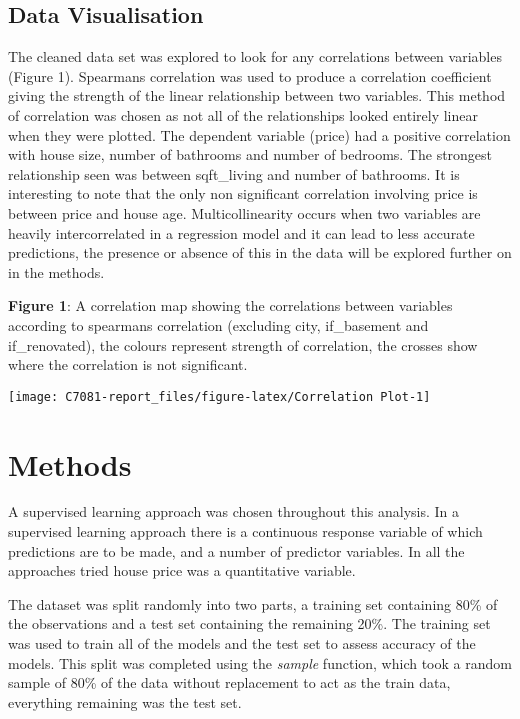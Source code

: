 \documentclass[
]{article}
\begin{document}
\hypertarget{data-visualisation}{%
\subsection{Data Visualisation}\label{data-visualisation}}

The cleaned data set was explored to look for any correlations between
variables (Figure 1). Spearmans correlation was used to produce a
correlation coefficient giving the strength of the linear relationship
between two variables. This method of correlation was chosen as not all
of the relationships looked entirely linear when they were plotted. The
dependent variable (price) had a positive correlation with house size,
number of bathrooms and number of bedrooms. The strongest relationship
seen was between sqft\_living and number of bathrooms. It is interesting
to note that the only non significant correlation involving price is
between price and house age. Multicollinearity occurs when two variables
are heavily intercorrelated in a regression model and it can lead to
less accurate predictions, the presence or absence of this in the data
will be explored further on in the methods.

\textbf{Figure 1}: A correlation map showing the correlations between
variables according to spearmans correlation (excluding city,
if\_basement and if\_renovated), the colours represent strength of
correlation, the crosses show where the correlation is not significant.

\texttt{[image: C7081-report\_files/figure-latex/Correlation Plot-1]}

\hypertarget{methods}{%
\section{Methods}\label{methods}}

A supervised learning approach was chosen throughout this analysis. In a
supervised learning approach there is a continuous response variable of
which predictions are to be made, and a number of predictor variables.
In all the approaches tried house price was a quantitative variable.

The dataset was split randomly into two parts, a training set containing
80\% of the observations and a test set containing the remaining 20\%.
The training set was used to train all of the models and the test set to
assess accuracy of the models. This split was completed using the
\emph{sample} function, which took a random sample of 80\% of the data
without replacement to act as the train data, everything remaining was
the test set.
\end{document}
